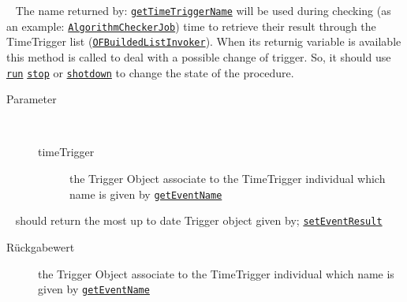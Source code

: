 \begin{description}
~ The name returned by: \texttt{\hyperlink{ontologyFramework.OFProcedureManagment.OFProcedureInterface.getTimeTriggerName(ontologyFramework.OFContextManagement.OWLReferences)}{getTimeTriggerName}}
 will be used during checking (as an example: 
 \texttt{\hyperlink{ontologyFramework.OFProcedureManagment.OFProcedureImplementation.AlgorithmCheckerJob-class}{AlgorithmCheckerJob}})
 time to retrieve their result through the TimeTrigger list 
 (\texttt{\hyperlink{ontologyFramework.OFRunning.OFInvokingManager.OFBuildedListInvoker-class}{OFBuildedListInvoker}}). When its returnig variable 
 is available this method is called to deal
 with a possible change of trigger. So, it should 
 use \texttt{\hyperlink{ontologyFramework.OFProcedureManagment.OFProcedureInterface.run()}{run}} \texttt{\hyperlink{ontologyFramework.OFProcedureManagment.OFProcedureInterface.stop()}{stop}} or \texttt{\hyperlink{ontologyFramework.OFProcedureManagment.OFProcedureInterface.shotdown()}{shotdown}} to change
 the state of the procedure.
\begin{description}
\item[Parameter] ~
\begin{description}
\item[timeTrigger]
the Trigger Object associate to the TimeTrigger individual
 which name is given by \texttt{\hyperlink{ontologyFramework.OFProcedureManagment.OFProcedureInterface.getEventName(ontologyFramework.OFContextManagement.OWLReferences)}{getEventName}}
\end{description}
\end{description}
\item[{\ltdHypertarget{ontologyFramework.OFProcedureManagment.OFProcedureInterface.getTimeTrigger()}{getTimeTrigger}\label{ontologyFramework.OFProcedureManagment.OFProcedureInterface.getTimeTrigger()}}]
~ should return the most up to date Trigger object given by;
 \texttt{\hyperlink{ontologyFramework.OFProcedureManagment.OFProcedureInterface.setEventResult(boolean)}{setEventResult}}
\begin{description}
\item[Rückgabewert] 
the Trigger Object associate to the TimeTrigger individual
 which name is given by \texttt{\hyperlink{ontologyFramework.OFProcedureManagment.OFProcedureInterface.getEventName(ontologyFramework.OFContextManagement.OWLReferences)}{getEventName}}

\end{description}
\end{description}
